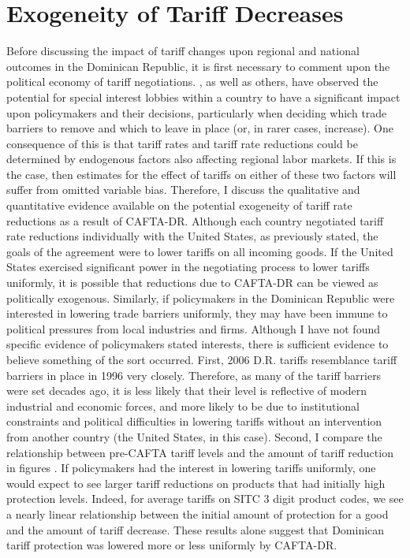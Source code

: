 \documentclass[12pt]{article}
\begin{document}


\vspace{-10pt}
\section{Exogeneity of Tariff Decreases}
\label{sec:Exogeneity}
Before discussing the impact of tariff changes upon regional and national outcomes in the Dominican 
Republic, it is first necessary to comment upon the political economy of tariff negotiations. 
\citet{brock1978}, as well as others, have observed the potential for special interest lobbies within 
a country to have a significant impact upon policymakers and their decisions, particularly when 
deciding which trade barriers to remove and which to leave in place (or, in rarer cases, increase). 
One consequence of this is that tariff rates and tariff rate reductions could be determined by 
endogenous factors also affecting regional labor markets. If this is the case, then 
estimates for the effect of tariffs on either of these two factors will suffer from omitted variable 
bias. Therefore, I discuss the qualitative and quantitative evidence available on the potential 
exogeneity of tariff rate reductions as a result of CAFTA-DR. Although each country negotiated tariff 
rate reductions individually with the United States, as previously stated, the goals of the agreement 
were to lower tariffs on all incoming goods. If the United States exercised significant power in the 
negotiating process to lower tariffs uniformly, it is possible that reductions due to CAFTA-DR can be 
viewed as politically exogenous. Similarly, if policymakers in the Dominican Republic were interested 
in lowering trade barriers uniformly, they may have been immune to political pressures from local 
industries and firms. Although I have not found specific evidence of policymakers stated interests, 
there is sufficient evidence to believe something of the sort occurred. First, 2006 D.R. tariffs 
resemblance tariff barriers in place in 1996 very closely. Therefore, as many of the tariff barriers 
were set decades ago, it is less likely that their level is reflective of modern industrial and 
economic forces, and more likely to be due to institutional constraints and political difficulties in 
lowering tariffs without an intervention from another country (the United States, in this case). 
Second, I compare the relationship between pre-CAFTA tariff levels and the amount of tariff reduction 
in figures %
. If policymakers had the interest in lowering tariffs uniformly, one would expect 
to see larger tariff reductions on products that had initially high protection levels. Indeed, for 
average tariffs on SITC 3 digit product codes, we see a nearly linear relationship between the 
initial amount of protection for a good and the amount of tariff decrease. These results alone 
suggest that Dominican tariff protection was lowered more or less uniformly by CAFTA-DR.
\end{document}
